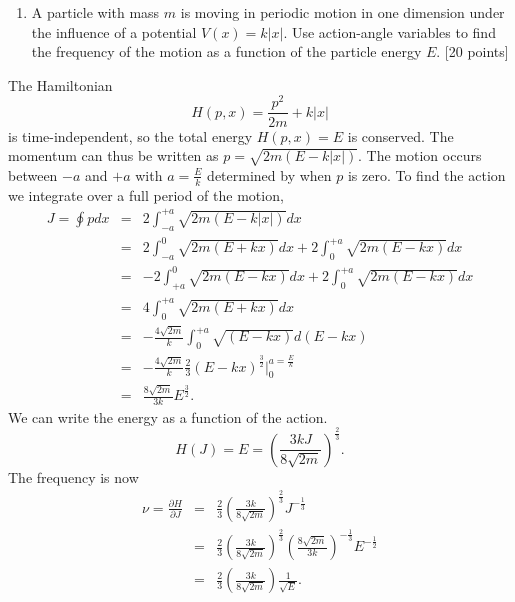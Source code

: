 \documentclass[letterpaper,11pt]{article}
\begin{document}
\begin{enumerate}[resume]
 \item A particle with mass $m$ is moving in periodic motion in one dimension under the influence of a potential $V(x) = k|x|$.  Use action-angle variables to find the frequency of the motion as a function of the particle energy $E$. [20 points]
 \begin{center}
 \end{center}
\end{enumerate}

The Hamiltonian
\begin{equation*}
 H(p,x) = \frac{p^2}{2m} + k|x|
\end{equation*}
is time-independent, so the total energy $H(p,x) = E$ is conserved.  The momentum can thus be written as $p = \sqrt{2m \left(E - k|x|\right)}$.
The motion occurs between $-a$ and $+a$ with $a = \frac{E}{k}$ determined by when $p$ is zero.  To find the action we integrate over a full period of the motion,
\begin{eqnarray*}
 J = \oint p dx & = & 2 \int_{-a}^{+a} \sqrt{2m \left(E - k|x|\right)} dx \\
 & = & 2 \int_{-a}^0 \sqrt{2m \left(E + k x\right)} dx + 2 \int_0^{+a} \sqrt{2m \left(E - k x\right)} dx \\
 & = & - 2 \int_{+a}^0 \sqrt{2m \left(E - k x\right)} dx + 2 \int_0^{+a} \sqrt{2m \left(E - k x\right)} dx \\
 & = & 4 \int_0^{+a} \sqrt{2m \left(E + k x\right)} dx \\
 & = & - \frac{4\sqrt{2m}}{k} \int_0^{+a} \sqrt{\left(E - k x\right)} d(E - k x) \\
 & = & - \frac{4\sqrt{2m}}{k} \frac{2}{3} \left(E - k x\right)^\frac{3}{2}|_0^{a = \frac{E}{k}} \\
 & = & \frac{8\sqrt{2m}}{3k} E^\frac{3}{2}.
\end{eqnarray*}
We can write the energy as a function of the action.
\begin{equation*}
 H(J) = E = \left(\frac{3kJ}{8\sqrt{2m}}\right)^\frac{2}{3}.
\end{equation*}
The frequency is now
\begin{eqnarray*}
 \nu = \frac{\partial H}{\partial J} & = & \frac{2}{3} \left(\frac{3k}{8\sqrt{2m}}\right)^\frac{2}{3} J^{-\frac{1}{3}} \\
 & = & \frac{2}{3} \left(\frac{3k}{8\sqrt{2m}}\right)^\frac{2}{3} \left(\frac{8\sqrt{2m}}{3k}\right)^{-\frac{1}{3}} E^{-\frac{1}{2}} \\
 & = & \frac{2}{3} \left(\frac{3k}{8\sqrt{2m}}\right) \frac{1}{\sqrt{E}}.
\end{eqnarray*}
\end{document}

